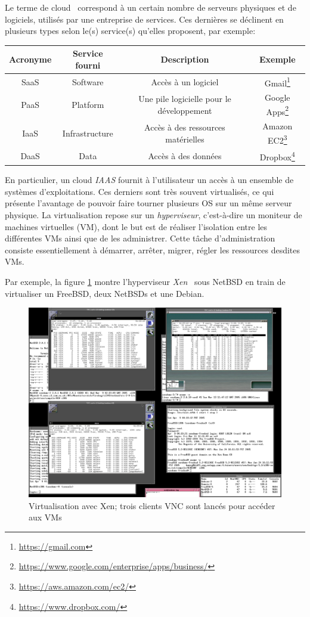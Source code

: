 \documentclass[a4paper]{article}
\begin{document}
Le terme de \og cloud \fg\ correspond à un certain nombre de serveurs
physiques et de logiciels, utilisés par une entreprise de services. Ces
dernières se déclinent en plusieurs types selon le(s) service(s) qu'elles
proposent, par exemple:
\begin{center}
\begin{tabular}{c|c|c|c}
	\textbf{Acronyme} & \textbf{Service} \textbf{fourni} & \textbf{Description} & \textbf{Exemple} \\
	\hline
	\hline
	SaaS & Software & Accès à un logiciel &
		Gmail\footnote{\url{https://gmail.com}} \\
	\hline
	PaaS & Platform & Une pile logicielle pour le développement &
		Google Apps\footnote{\url{https://www.google.com/enterprise/apps/business/}} \\
	\hline
	IaaS & Infrastructure & Accès à des ressources matérielles &
		Amazon EC2\footnote{\url{https://aws.amazon.com/ec2/}} \\
	\hline
	DaaS & Data & Accès à des données &
		Dropbox\footnote{\url{https://www.dropbox.com/}}
\end{tabular}
\end{center}

En particulier, un cloud \textit{IAAS} fournit à l'utilisateur un accès
à un ensemble de systèmes d'exploitations. Ces derniers sont très
souvent virtualisés, ce qui présente l'avantage de pouvoir faire tourner
plusieurs OS sur un même serveur physique. La virtualisation repose sur
un \textit{hyperviseur}, c'est-à-dire un moniteur de machines virtuelles (VM), dont
le but est de réaliser l'isolation entre les différentes VMs ainsi que de les administrer.
Cette tâche d'administration consiste essentiellement à démarrer, arrêter, migrer,
régler les ressources desdites VMs.

Par exemple, la figure \ref{hubertfxen} montre l'hyperviseur \textit{Xen}~\cite{barham2003xen}
sous NetBSD en train de virtualiser un FreeBSD, deux NetBSDs et une Debian.
\begin{figure}[!ht]
	\centering
	\includegraphics[scale=.17]{imgs/hubertf-xen.png}
	\caption{\label{hubertfxen} Virtualisation avec Xen; trois clients
		VNC \protect\footnotemark sont lancés pour accéder aux VMs}
\end{figure}
\end{document}
